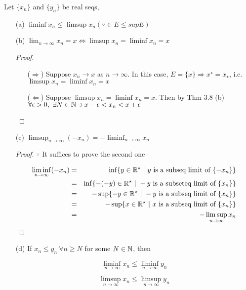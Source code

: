 \begin{thm*}
	Let $\{x_n\}$ and $\{y_n\}$ be real seqs,
	
	\begin{enumerate}
		\item[(a)] $\liminf x_n \leq \limsup x_n (\because \in E \leq sup E)$
		\item[(b)] $\lim_{n \rightarrow \infty} x_n = x \Leftrightarrow \limsup x_n = \liminf x_n = x$
		
		\begin{proof}$ $
	\begin{enumerate}
		\item[($\Rightarrow$)]
		Suppose $x_n \rightarrow x$ as $n \rightarrow \infty$. In this case, $E = \{x\} \Rightarrow x^\star = x_\star$, i.e. $\limsup x_n = \liminf x_n = x$
		\item[($\Leftarrow$)] Suppose $\limsup x_n = \liminf x_n = x$. Then by Thm 3.8 (b) $\forall \epsilon > 0,~ \exists N \in \mathbb{N} \ni x- \epsilon < x_n < x + \epsilon$
	\end{enumerate}
\end{proof}

	\item[(c)] $\limsup_{n \rightarrow \infty}(-x_n) = -\liminf_{n \rightarrow \infty} x_n$
	\begin{proof}
		$\because$ It suffices to prove the second one
		
		\begin{eqnarray*}
			\liminf_{n \rightarrow \infty}(- x_n) & = & \inf \{y \in \mathbb{R}^\star ~|~ y \text{ is a subseq limit of } \{-x_n\}\}\\
			&=& \inf \{-(-y) \in \mathbb{R}^\star ~|~ -y \text{ is a subseteq limit of } \{x_n\} \} \\
			&=& -\sup \{-y \in \mathbb{R}^\star ~|~ -y \text{ is a subseq limit of } \{x_n\}\}\\
			&=& -\sup \{x \in \mathbb{R}^\star ~|~ x \text{ is a subseq limit of } \{x_n\}\}\\
			&=& -\limsup_{n \rightarrow \infty} x_n 
		\end{eqnarray*}
	\end{proof}
	
	\item[(d)] If $x_n \leq y_n~ \forall n \geq N$ for some $N \in \mathbb{N}$, then 
	
	$$\liminf_{n \rightarrow \infty} x_n \leq \liminf_{n \rightarrow \infty} y_n$$
	
	$$\limsup_{n \rightarrow \infty} x_n \leq \limsup_{n \rightarrow \infty}y_n$$
	

\end{enumerate}
\end{thm*}
